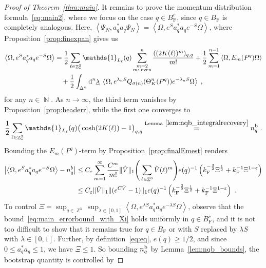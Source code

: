 \documentclass[12pt,a4paper]{article}
\numberwithin{equation}{section}
\newcommand{\1}{\mathbb{I}}
\renewcommand{\b}{\textnormal{b}}
\newcommand{\di}{\textnormal{d}}
\newcommand{\F}{\mathrm{F}}
\DeclareMathOperator{\N}{\mathbb{N}}
\DeclareMathOperator{\Z}{\mathbb{Z}}
\newcommand{\half}{\frac{1}{2}}
\newcommand{\eva}[1]{\left\langle #1 \right\rangle}
\theoremstyle{plain}
\theoremstyle{definition}
\theoremstyle{remark}
\theoremstyle{plain}
\theoremstyle{definition}
\theoremstyle{remark}
\begin{document}
\begin{proof}[Proof of Theorem~\ref{thm:main}]
It remains to prove the momentum distribution formula~\eqref{eq:main2}, where we focus on the case $ q \in B_{\F}^c $, since $ q \in B_{\F} $ is completely analogous. Here, $ \eva{\Psi_N, a_q^* a_q \Psi_N} = \eva{\Omega, e^{S} a_q^* a_q e^{-S} \Omega} $, where Proposition~\ref{prop:finexpan} gives us
\begin{align*}
	\eva{\Omega, e^{S} a_q^* a_q e^{-S} \Omega} 
	&= \half\sum\limits_{\ell\in \Z^3_*}\mathds{1}_{L_\ell}(q) \sum\limits_{\substack{m=2\\m:\textnormal{ even}}}^n \frac{((2K(\ell))^m)_{q,q}}{m!}
		+ \half \sum\limits_{m=1}^{n-1} \eva{\Omega, E_m(P^q)\Omega}\nonumber\\
	&\quad +\half \int_{\Delta^n} \di^n\underline{\lambda} \;
		\eva{\Omega, e^{\lambda_n S}Q_{\sigma(n)}(\Theta^n_{K}(P^q)) e^{-\lambda_n S} \Omega} \;,
\end{align*}
for any $ n \in \N $. As $ n \to \infty $, the third term vanishes by Proposition~\ref{prop:headerr}, while the first one converges to
\begin{equation*}
	\half\sum\limits_{\ell\in \Z^3_*}\mathds{1}_{L_\ell}(q) \big( \cosh(2K(\ell)) - 1 \big)_{q,q} 
	\overset{\textnormal{Lemma}~\ref{lem:nqb_integralrecovery}}{=} n_q^{\b} \;.
\end{equation*}
Bounding the $ E_m(P^q) $-term by Proposition~\ref{prop:finalEmest} renders
\begin{equation} \label{eq:main_errorbound_with_Xi}
\begin{aligned}
	\abs{\eva{\Omega, e^{S} a_q^* a_q e^{-S} \Omega} - n_q^b}
	&\le C_\varepsilon \sum_{m=1}^\infty \frac{C^m}{m!} \Vert \hat{V} \Vert_1
		\Bigg( \sum_{\ell \in \Z^3} \hat{V}(\ell)^m \Bigg)
		e(q)^{-1} \left( k_{\F}^{-\frac{3}{2}} \Xi^\half
		+ k_{\F}^{-1}\Xi^{1-\varepsilon} \right) \\
	&\le C_\varepsilon \Vert \hat{V} \Vert_1 \Vert (e^{C \hat{V}}-1) \Vert_1
		e(q)^{-1} \left( k_{\F}^{-\frac{3}{2}} \Xi^\half
		+ k_{\F}^{-1}\Xi^{1-\varepsilon} \right) \;.
\end{aligned}
\end{equation}
To control $ \Xi = \sup_{q \in \Z^3} \sup_{\lambda \in [0,1]} \eva{\Omega, e^{\lambda S} a_q^* a_q e^{- \lambda S} \Omega} $, observe that the bound~\eqref{eq:main_errorbound_with_Xi} holds uniformly in $ q \in B_{\F}^c $, and it is not too difficult to show that it remains true for $ q \in B_{\F} $ or with $ S $ replaced by $ \lambda S $ with $ \lambda \in [0,1] $. Further, by definition~\eqref{eq:eq}, $ e(q) \ge 1/2 $, and since $ 0 \le a_q^* a_q \le 1 $, we have $ \Xi \le 1 $. So bounding $ n_q^{\b} $ by Lemma~\ref{lem:nqb_bounds}, the bootstrap quantity is controlled by

\end{proof}
\end{document}
